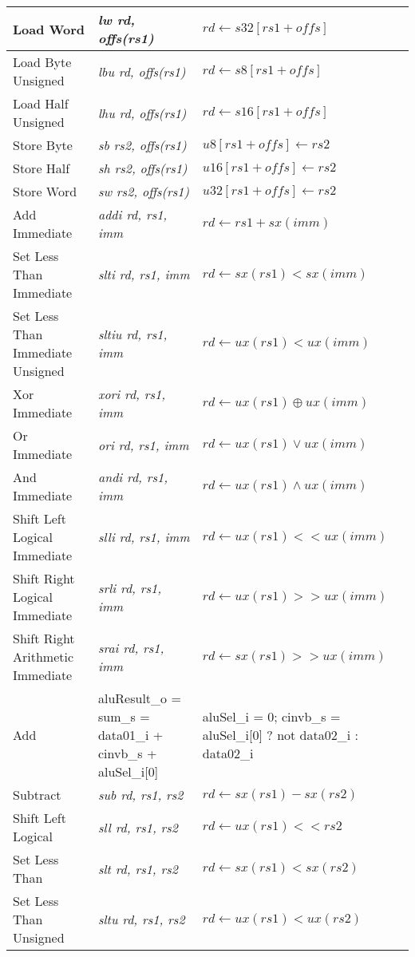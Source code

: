 \begin{longtable}{|m{3.5cm}<{\raggedright} |m{3cm}<{\raggedright} |m{5.5cm}<{\raggedright} |}
\hline
Load Word & \textit{lw rd, offs(rs1)} & $rd \leftarrow s32[rs1 + offs]$ \\
\hline
Load Byte Unsigned & \textit{lbu rd, offs(rs1)} & $rd \leftarrow s8[rs1 + offs]$ \\
\hline
Load Half Unsigned & \textit{lhu rd, offs(rs1)} & $rd \leftarrow s16[rs1 + offs]$ \\
\hline
Store Byte & \textit{sb rs2, offs(rs1)} & $u8[rs1 + offs] \leftarrow rs2$ \\
\hline
Store Half & \textit{sh rs2, offs(rs1)} & $u16[rs1 + offs] \leftarrow rs2$ \\
\hline
Store Word & \textit{sw rs2, offs(rs1)} & $u32[rs1 + offs] \leftarrow rs2$ \\
\hline
Add Immediate & \textit{addi rd, rs1, imm} & $rd \leftarrow rs1 + sx(imm)$ \\
\hline
Set Less Than Immediate & \textit{slti rd, rs1, imm} & $rd \leftarrow sx(rs1) < sx(imm)$ \\
\hline
Set Less Than Immediate Unsigned & \textit{sltiu rd, rs1, imm} & $rd \leftarrow ux(rs1) < ux(imm)$ \\
\hline
Xor Immediate & \textit{xori rd, rs1, imm} & $rd \leftarrow ux(rs1) \oplus ux(imm)$ \\
\hline
Or Immediate & \textit{ori rd, rs1, imm} & $rd \leftarrow ux(rs1) \vee ux(imm)$ \\
\hline
And Immediate & \textit{andi rd, rs1, imm} & $rd \leftarrow ux(rs1) \wedge ux(imm)$ \\
\hline
Shift Left Logical Immediate & \textit{slli rd, rs1, imm} & $rd \leftarrow ux(rs1) << ux(imm)$ \\
\hline
Shift Right Logical Immediate & \textit{srli rd, rs1, imm} & $rd \leftarrow ux(rs1) >> ux(imm)$ \\
\hline
Shift Right Arithmetic Immediate & \textit{srai rd, rs1, imm} & $rd \leftarrow sx(rs1) >> ux(imm)$ \\
\hline
Add & aluResult\_o = sum\_s = data01\_i + cinvb\_s + aluSel\_i[0] & aluSel\_i = 0; cinvb\_s = aluSel\_i[0] ? not data02\_i : data02\_i \\
\hline
Subtract & \textit{sub rd, rs1, rs2} & $rd \leftarrow sx(rs1) - sx(rs2)$ \\
\hline
Shift Left Logical & \textit{sll rd, rs1, rs2} & $rd \leftarrow ux(rs1) << rs2$ \\
\hline
Set Less Than & \textit{slt rd, rs1, rs2} & $rd \leftarrow sx(rs1) < sx(rs2)$ \\
\hline
Set Less Than Unsigned & \textit{sltu rd, rs1, rs2} & $rd \leftarrow ux(rs1) < ux(rs2)$ \\

\end{longtable}
